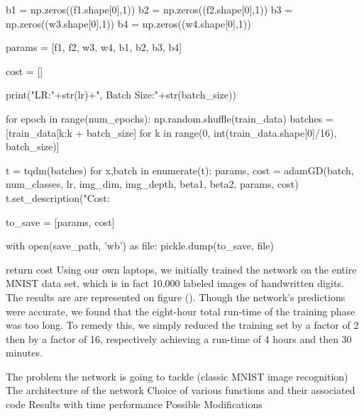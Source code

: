     b1 = np.zeros((f1.shape[0],1))
    b2 = np.zeros((f2.shape[0],1))
    b3 = np.zeros((w3.shape[0],1))
    b4 = np.zeros((w4.shape[0],1))

    params = [f1, f2, w3, w4, b1, b2, b3, b4]

    cost = []

    print("LR:"+str(lr)+", Batch Size:"+str(batch_size))

    for epoch in range(num_epochs):
        np.random.shuffle(train_data)
        batches = [train_data[k:k + batch_size] for k in range(0, int(train_data.shape[0]/16), batch_size)]

        t = tqdm(batches)
        for x,batch in enumerate(t):
            params, cost = adamGD(batch, num_classes, lr, img_dim, img_depth, beta1, beta2, params, cost)
            t.set_description("Cost: %
            
    to_save = [params, cost]
    
    with open(save_path, 'wb') as file:
        pickle.dump(to_save, file)
        
    return cost
\stoptyping
\startsection[title = Results]
Using our own laptops, we initially trained the network on the entire MNIST data set, which is in fact 10.000 labeled images of handwritten digits.
The results are are represented on figure ().
Though the network's predictions were accurate, we found that the eight-hour total run-time of the training phase  was too long.
To remedy this, we simply reduced the training set by a factor of 2 then by a factor of 16, respectively achieving a run-time of 4 hours and then 30 minutes. 





\stopsection

\startitemize
\startitem 
The problem the network is going to tackle (classic MNIST image recognition)
\stopitem
\startitem
The architecture of the network
\stopitem
\startitem
Choice of various functions and their associated code
\stopitem
\startitem
Results with time performance
\stopitem
\startitem
Possible Modifications
\stopitem
\stopitemize
\stopsection
